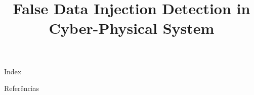 \documentclass[ieee,english]{slides}
\title{False Data Injection Detection in Cyber-Physical System}
\begin{document}
\maketitle{}

\begin{slide}{Index}
  \begin{minipage}[t][0.6\textheight][t]{0.5\textwidth}
    \tableofcontents[sections={1-3}]
  \end{minipage}
  \begin{minipage}[t][4\baselineskip][t]{0.5\textwidth}
    \tableofcontents[sections={4-}]
  \end{minipage}
  \vfill\null{}
\end{slide}






\begin{frame}[allowframebreaks]{Referências}
  \nocite{*}
  \printbibliography{}
\end{frame}
\end{document}
